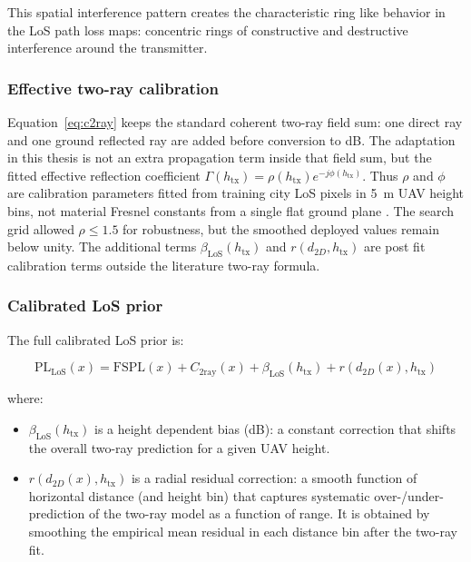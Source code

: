 This spatial interference pattern creates the characteristic ring like
behavior in the LoS path loss maps: concentric rings of constructive and
destructive interference around the transmitter.

\subsubsection{Effective two-ray calibration}

Equation~\eqref{eq:c2ray} keeps the standard coherent two-ray field sum: one
direct ray and one ground reflected ray are added before conversion to dB. The
adaptation in this thesis is not an extra propagation term inside that field
sum, but the fitted effective reflection coefficient
\(\Gamma(h_{\mathrm{tx}})=\rho(h_{\mathrm{tx}})e^{-j\phi(h_{\mathrm{tx}})}\).
Thus \(\rho\) and \(\phi\) are calibration parameters fitted from training city
LoS pixels in \SI{5}{m} UAV height bins, not material Fresnel constants from a
single flat ground plane \cite{rappaport,goldsmith}. The search grid allowed
\(\rho \le 1.5\) for robustness, but the smoothed deployed values remain below
unity. The additional terms
\(\beta_{\mathrm{LoS}}(h_{\mathrm{tx}})\) and
\(r(d_{2D},h_{\mathrm{tx}})\) are post fit calibration terms outside the
literature two-ray formula.

\subsubsection{Calibrated LoS prior}

The full calibrated LoS prior is:

\begin{equation}
\mathrm{PL}_{\mathrm{LoS}}(x)
=
\mathrm{FSPL}(x)
+ C_{\mathrm{2ray}}(x)
+ \beta_{\mathrm{LoS}}(h_{\mathrm{tx}})
+ r(d_{2D}(x), h_{\mathrm{tx}})
\label{eq:pl_los}
\end{equation}

where:
\begin{itemize}
\item \(\beta_{\mathrm{LoS}}(h_{\mathrm{tx}})\) is a height dependent bias (dB): a constant
      correction that shifts the overall two-ray prediction for a given UAV
      height.
\item $r(d_{2D}(x), h_{\mathrm{tx}})$ is a radial residual correction: a
      smooth function of horizontal distance (and height bin) that captures
      systematic over-/under-prediction of the two-ray model as a function of
      range. It is obtained by smoothing the empirical mean residual in each
      distance bin after the two-ray fit.
\end{itemize}

